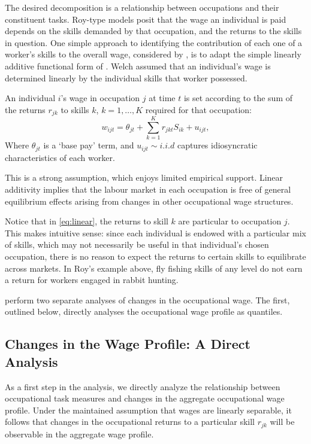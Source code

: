 The desired decomposition is a relationship between occupations and their constituent tasks. Roy-type models posit that the wage an individual is paid depends on the skills demanded by that occupation, and the returns to the skills in question. One simple approach to identifying the contribution of each one of a worker's skills to the overall wage, considered by \citet{Firpo2011}, is to adapt the simple linearly additive functional form of \citet{Welch1969}. Welch assumed that an individual's wage is determined linearly by the individual skills that worker possessed.
\begin{assumption} \label{ass:linear}
  An individual $i$'s wage in occupation $j$ at time $t$ is set according to the sum of the returns $r_{jk}$ to skills $k$, $k=1,\dots,K$ required for that occupation:
\begin{equation}
  w_{ijt} = \theta_{jt} + \sum_{k=1}^K r_{jkt}S_{ik} + u_{ijt}, \label{eq:linear}
\end{equation}
Where $\theta_{jt}$ is a `base pay' term, and $u_{ijt}\sim i.i.d$ captures idiosyncratic characteristics of each worker. 
\end{assumption}

This is a strong assumption, which enjoys limited empirical support. Linear additivity implies that the labour market in each occupation is free of general equilibrium effects arising from changes in other occupational wage structures.

Notice that in \eqref{eq:linear}, the returns to skill $k$ are particular to occupation $j$. This makes intuitive sense: since each individual is endowed with a particular mix of skills, which may not necessarily be useful in that individual's chosen occupation, there is no reason to expect the returns to certain skills to equilibrate across markets. In Roy's example above, fly fishing skills of any level do not earn a return for workers engaged in rabbit hunting. %

\citet{Firpo2011} perform two separate analyses of changes in the occupational wage. The first, outlined below, directly analyses the occupational wage profile as quantiles.

\subsection{Changes in the Wage Profile: A Direct Analysis} \label{sec:direct}

As a first step in the analysis, we directly analyze the relationship between occupational task measures and changes in the aggregate occupational wage profile. Under the maintained assumption that wages are linearly separable, it follows that changes in the occupational returns to a particular skill $r_{jk}$ will be observable in the aggregate wage profile.

